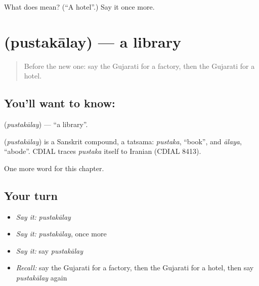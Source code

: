 \begin{tcolorbox}[breakable,colback=teal!4,colframe=teal!35!black,title={Before you move on}]
What does  mean? (\textquotedblleft{}A hotel\textquotedblright{}.) Say it once more.
\end{tcolorbox}
\section[\texorpdfstring{\gu{પુસ્તકાલય} (pustakālay)}{પુસ્તકાલય (pustakālay)}]{ (pustakālay) — a library}

\label{lesson:GU-C128-pustakalay}



\begin{quote}
Before the new one: say the Gujarati for a factory, then the Gujarati for a hotel.
\end{quote}

\subsection*{You'll want to know: }
\textbf{} (\emph{pustakālay}) — \textquotedblleft{}a library\textquotedblright{}.

\begin{cousinweb}
\textbf{} (\emph{pustakālay}) is a Sanskrit compound, a tatsama: \emph{pustaka}, \textquotedblleft{}book\textquotedblright{}, and \emph{ālaya}, \textquotedblleft{}abode\textquotedblright{}. CDIAL traces \emph{pustaka} itself to Iranian (CDIAL 8413).
\end{cousinweb}

\begin{grammarlens}[title={What you've built}]
One more word for this chapter.
\end{grammarlens}

\subsection*{Your turn}
\begin{itemize}
\raggedright
  \item \emph{Say it:} \emph{pustakālay}
  \item \emph{Say it:} \emph{pustakālay}, once more
  \item \emph{Say it:} say \emph{pustakālay}
  \item \emph{Recall:} say the Gujarati for a factory, then the Gujarati for a hotel, then say \emph{pustakālay} again
\end{itemize}

